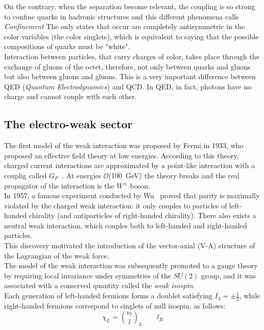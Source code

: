 On the contrary, when the separation become relevant, the coupling is so strong to confine quarks in hadronic  structures and this different phenomena calls \textit{Confinement}
The only states that occur are completely antisymmetric in the color variables (the color singlets), which is equivalent to saying that the possible compositions of quarks must be "white".\\
Interaction between particles, that carry charges of color, takes place through the exchange of gluons of the octet, therefore, not only between quarks and gluons but also between gluons and gluons. This is a very important difference between QED (\textit{Quantum Electrodynamics}) and QCD. In QED, in fact, photons have no charge and cannot couple with each other.

\subsection{The electro-weak sector}
\label{sec:ew}
The first model of the weak interaction was proposed by Fermi in 1933, who proposed an effective field theory at low energies. According to this theory, 
charged current interactions are approximated by a point-like interaction with a couplig called $G_F$~\cite{fermi,wilson}.
At energies $\mathcal{O}$(100~GeV) the theory breaks and the real propagator of the interaction is the $W^\pm$ boson.\\
In 1957, a famous experiment conducted by Wu~\cite{wu} proved that parity is maximally violated by the charged
weak interaction: it only couples to particles of left-handed chirality (and antiparticles of right-handed chirality). There also exists a neutral weak interaction, which couples both
to left-handed and right-handed particles. \\
This discovery motivated the introduction of the vector-axial (V-A) structure of the Lagrangian of the weak force. \\
The model of the weak interaction was subsequently promoted to a gauge theory by requiring local invariance under symmetries of the $SU(2)$ group, and it was associated
with a conserved quantity called the \textit{weak isospin}.
\vspace{\baselineskip}
\\Each generation of left-handed fermions forms a doublet satisfying $I_{3}= \pm\frac{1}{2}$, while right-handed fermions correspond to singlets of null isospin, as follows:
\begin{equation} 
\chi_{L}=\binom{\nu_l}{l}_L  \qquad l_R
\end{equation}
